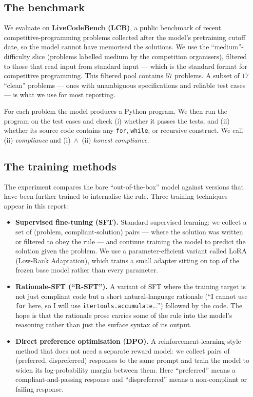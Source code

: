 \documentclass[11pt]{article}
\begin{document}
\subsection{The benchmark}

We evaluate on \textbf{LiveCodeBench (LCB)}, a public benchmark of recent
competitive-programming problems collected after the model's pretraining
cutoff date, so the model cannot have memorised the solutions. We use the
``medium''-difficulty slice (problems labelled medium by the competition
organisers), filtered to those that read input from standard input --- which
is the standard format for competitive programming. This filtered pool
contains $57$ problems. A subset of $17$ ``clean'' problems --- ones with
unambiguous specifications and reliable test cases --- is what we use for
most reporting.

For each problem the model produces a Python program. We then run the program
on the test cases and check (i) whether it passes the tests, and (ii) whether
its source code contains any \texttt{for}, \texttt{while}, or recursive
construct. We call (ii) \emph{compliance} and (i)~$\wedge$~(ii) \emph{honest
compliance}.

\subsection{The training methods}

The experiment compares the bare ``out-of-the-box'' model against versions
that have been further trained to internalise the rule. Three training
techniques appear in this report:

\begin{itemize}
\item \textbf{Supervised fine-tuning (SFT).} Standard supervised learning:
      we collect a set of (problem, compliant-solution) pairs --- where the
      solution was written or filtered to obey the rule --- and continue
      training the model to predict the solution given the problem. We use
      a parameter-efficient variant called LoRA (Low-Rank Adaptation), which
      trains a small adapter sitting on top of the frozen base model rather
      than every parameter.
\item \textbf{Rationale-SFT (``R-SFT'').} A variant of SFT where the training
      target is not just compliant code but a short natural-language
      rationale (``I cannot use \texttt{for} here, so I will use
      \texttt{itertools.accumulate}\ldots'') followed by the code. The hope
      is that the rationale prose carries some of the rule into the model's
      reasoning rather than just the surface syntax of its output.
\item \textbf{Direct preference optimisation (DPO).} A reinforcement-learning
      style method that does not need a separate reward model: we collect
      pairs of (preferred, dispreferred) responses to the same prompt and
      train the model to widen its log-probability margin between them.
      Here ``preferred'' means a compliant-and-passing response and
      ``dispreferred'' means a non-compliant or failing response.
\end{itemize}
\end{document}
